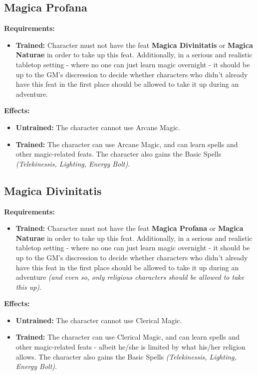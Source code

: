 \documentclass[openany,10pt,a4paper]{book}
\begin{document}
\begin{itemize}
\begin{itemize}
\begin{itemize}
\begin{itemize}
\subsection{Magica Profana}
\begin{table}[!ht]
\centering
{}
\end{table}
\textbf{Requirements:}
\begin{itemize}
	\item \textbf{Trained:} Character must not have the feat \textbf{Magica Divinitatis} or \textbf{Magica Naturae} in order to take up this feat. Additionally, in a serious and realistic tabletop setting - where no one can just learn magic overnight - it should be up to the GM's discression to decide whether characters who didn't already have this feat in the first place should be allowed to take it up during an adventure.
\end{itemize}
\textbf{Effects:}
\begin{itemize}
	\item \textbf{Untrained:} The character cannot use Arcane Magic.
	\item \textbf{Trained:} The character can use Arcane Magic, and can learn spells and other magic-related feats. The character also gains the Basic Spells \textit{(Telekinessis, Lighting, Energy Bolt)}.
\end{itemize}\newpage
\subsection{Magica Divinitatis}
\begin{table}[!ht]
\centering
{}
\end{table}
\textbf{Requirements:}
\begin{itemize}
	\item \textbf{Trained:} Character must not have the feat \textbf{Magica Profana} or \textbf{Magica Naturae} in order to take up this feat. Additionally, in a serious and realistic tabletop setting - where no one can just learn magic overnight - it should be up to the GM's discression to decide whether characters who didn't already have this feat in the first place should be allowed to take it up during an adventure \textit{(and even so, only religious characters should be allowed to take this up)}.
\end{itemize}
\textbf{Effects:}
\begin{itemize}
	\item \textbf{Untrained:} The character cannot use Clerical Magic.
	\item \textbf{Trained:} The character can use Clerical Magic, and can learn spells and other magic-related feats - albeit he/she is limited by what his/her religion allows. The character also gains the Basic Spells \textit{(Telekinessis, Lighting, Energy Bolt)}.
\end{itemize}\newpage

\end{itemize}
\end{itemize}
\end{itemize}
\end{itemize}
\end{document}
